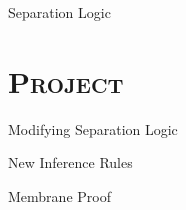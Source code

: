 \documentclass[xcolor=x11names,compress]{beamer}
\renewcommand{\(}{\begin{columns}}
\renewcommand{\)}{\end{columns}}
\newcommand{\<}[1]{\begin{column}{#1}}
\renewcommand{\>}{\end{column}}
\begin{document}
\begin{frame}{Separation Logic}
\end{frame}

\begin{frame}{}
\end{frame}

\section{\scshape Project}
\begin{frame}{Modifying Separation Logic}
\end{frame}

\begin{frame}{New Inference Rules}
\end{frame}

\begin{frame}{Membrane Proof}
\end{frame}
\end{document}
